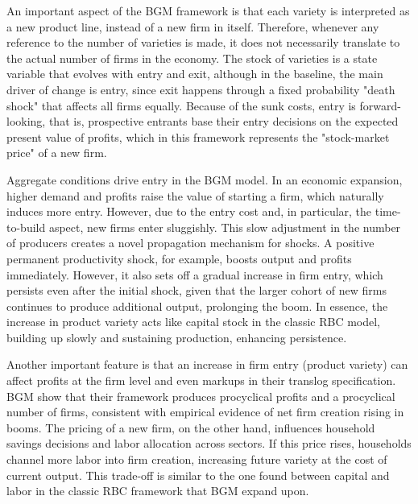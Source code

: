 \documentclass[a4paper,12pt]{article} %
\numberwithin{equation}{section} %
\numberwithin{figure}{section}
\numberwithin{table}{section}
\begin{document}
An important aspect of the BGM framework is that each variety is interpreted as a new product line, instead of a new firm in itself. 
Therefore, whenever any reference to the number of varieties is made, it does not necessarily translate to the actual number of firms in the economy. 
The stock of varieties is a state variable that evolves with entry and exit, although in the baseline, the main driver of change is entry, 
since exit happens through a fixed probability "death shock" that affects all firms equally. Because of the sunk costs, entry is forward-looking,
that is, prospective entrants base their entry decisions on the expected present value of profits, which in this framework represents the "stock-market price" of a new firm. 

Aggregate conditions drive entry in the BGM model. In an economic expansion, higher demand and profits raise the value of starting a firm, which naturally induces more entry. 
However, due to the entry cost and, in particular, the time-to-build aspect, new firms enter sluggishly. This slow adjustment in the number of producers creates a novel 
propagation mechanism for shocks. A positive permanent productivity shock, for example, boosts output and profits immediately. However, it also sets off a gradual increase in firm entry, 
which persists even after the initial shock, given that the larger cohort of new firms continues to produce additional output, prolonging the boom. In essence, the increase in 
product variety acts like capital stock in the classic RBC model, building up slowly and sustaining production, enhancing persistence.

Another important feature is that an increase in firm entry (product variety) can affect profits at the firm level and even markups in their translog specification. 
BGM show that their framework produces procyclical profits and a procyclical number of firms, consistent with empirical evidence of net firm creation rising in booms. 
The pricing of a new firm, on the other hand, influences household savings decisions and labor allocation across sectors. If this price rises, households channel more 
labor into firm creation, increasing future variety at the cost of current output. This trade-off is similar to the one found between capital and labor in the classic 
RBC framework that BGM expand upon.
\end{document}
